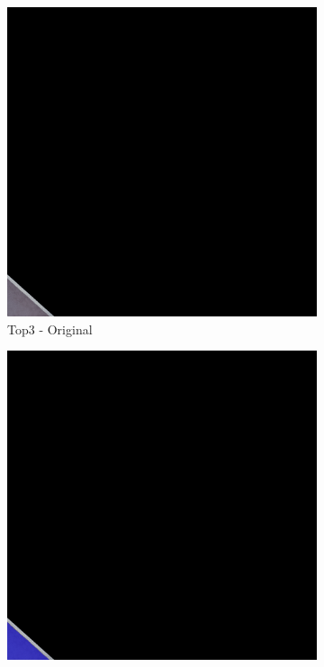\begin{figure}[H]
\begin{subfigure}{0.32\textwidth}
    \includegraphics[width=\textwidth]{02-main//figures/ch4/kfold_ensembles/upernet_tu-efficientnetv2_rw_s.ra2_in1k/best_cases/best_3_iou0.987_24941121_tile_16_8_fd3555_original.png}
    \caption{Top3 - Original}
\end{subfigure}
\hfill
\begin{subfigure}{0.32\textwidth}
    \includegraphics[width=\textwidth]{02-main//figures/ch4/kfold_ensembles/upernet_tu-efficientnetv2_rw_s.ra2_in1k/best_cases/best_3_iou0.987_24941121_tile_16_8_fd3555_overlay_gt.png}

\end{subfigure}
\end{figure}
